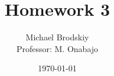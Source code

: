 


\title{Homework 3}
\date{\today}
\author{Michael Brodskiy\\ \small Professor: M. Onabajo}



\maketitle


